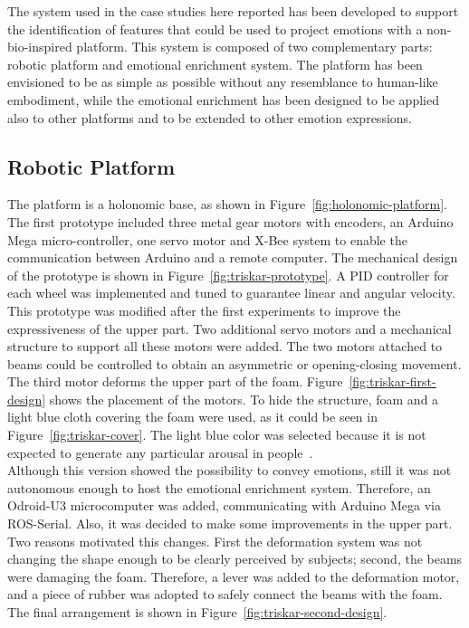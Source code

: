 The system used in the case studies here reported has been developed to support the identification of features that could be used to project emotions with a non-bio-inspired platform. This system is composed of two complementary parts: robotic platform and emotional enrichment system. The platform has been envisioned to be as simple as possible without any resemblance to human-like embodiment, while the emotional enrichment has been designed to be applied also to other platforms and to be extended to other emotion expressions. 
\subsection{Robotic Platform}
The platform is a holonomic base, as shown in Figure~\ref{fig:holonomic-platform}. The first prototype included three metal gear motors with encoders, an Arduino Mega micro-controller, one servo motor and X-Bee system to enable the communication between Arduino and a remote computer. The mechanical design of the prototype is shown in Figure~\ref{fig:triskar-prototype}. A PID controller for each wheel was implemented and tuned to guarantee linear and angular velocity.
\\
This prototype was modified after the first experiments to improve the expressiveness of the upper part. Two additional servo motors and a mechanical structure to support all these motors were added. The two motors attached to beams could be controlled to obtain an asymmetric or opening-closing movement. 
The third motor deforms the upper part of the foam. Figure~\ref{fig:triskar-first-design} shows the placement of the motors. To hide the structure, foam and a light blue cloth covering the foam were used, as it could be seen in Figure~\ref{fig:triskar-cover}. The light blue color was selected because it is not expected to generate any particular arousal in people~\cite{Promarker}. 
\\
Although this version showed the possibility to convey emotions, still it was not autonomous enough to host the emotional enrichment system. Therefore, an Odroid-U3 microcomputer was added, communicating with Arduino Mega via ROS-Serial.
Also, it was decided to make some improvements in the upper part. Two reasons motivated this changes. First the deformation system was not changing the shape enough to be clearly perceived by subjects; second, the beams were damaging the foam. Therefore, a lever  was added to the deformation motor, and a piece of rubber was adopted to safely connect the beams with the foam. The final arrangement is shown in Figure~\ref{fig:triskar-second-design}.\\ 
